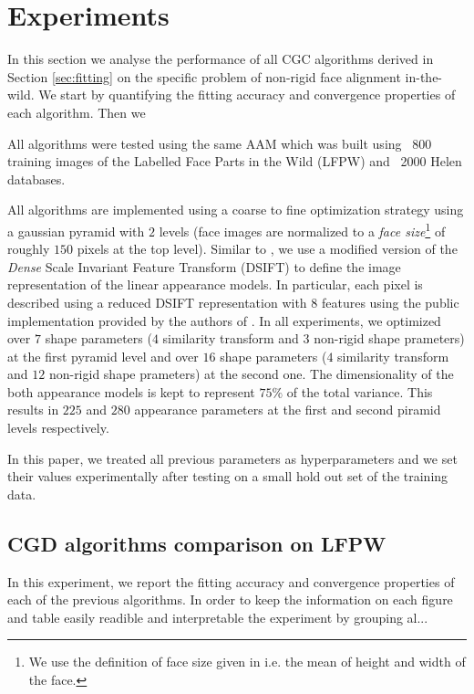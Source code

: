 \section{Experiments}
\label{sec:experiment}

In this section we analyse the performance of all CGC algorithms derived in Section \ref{sec:fitting} on the specific problem of non-rigid face alignment in-the-wild. We start by quantifying the fitting accuracy and convergence properties of each algorithm. Then we

All algorithms were tested using the same AAM which was built using ~800  training images of the Labelled Face Parts in the Wild (LFPW) \cite{Belhumeur2011} and ~2000 Helen \cite{Le2012} databases.

All algorithms are implemented using a coarse to fine optimization strategy using a gaussian pyramid with $2$ levels (face images are normalized to a \emph{face size}\footnote{We use the definition of face size given in \cite{Zhu2012} i.e. the mean of height and width of the face.} of roughly $150$ pixels at the top level). Similar to \cite{Tzimiropoulos2014}, we use a modified version of the \emph{Dense} Scale Invariant Feature Transform (DSIFT) \cite{Lowe1999, } to define the image representation of the linear appearance models. In particular, each pixel is described using a reduced DSIFT representation with $8$ features using the public implementation provided by the authors of \cite{Vedaldi2008vlfeat}. In all experiments, we optimized over $7$ shape parameters ($4$ similarity transform and $3$ non-rigid shape prameters) at the first pyramid level and over $16$ shape parameters ($4$ similarity transform and $12$ non-rigid shape prameters) at the second one. The dimensionality of the both appearance models is kept to represent $75\%$ of the total variance. This results in $225$ and $280$ appearance parameters at the first and second piramid levels respectively.

In this paper, we treated all previous parameters as hyperparameters and we set their values experimentally after testing on a small hold out set of the training data. 


\subsection{CGD algorithms comparison on LFPW}

In this experiment, we report the fitting accuracy and convergence properties of each of the previous algorithms. In order to keep the information on each figure and table easily readible and interpretable the experiment by grouping al...

